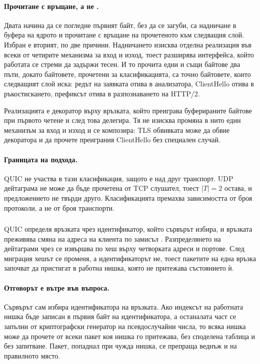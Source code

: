 \paragraph{Прочитане с връщане, а не .} Двата начина да се погледне първият
байт, без да се загуби, са надничане в буфера на ядрото и прочитане с връщане на прочетеното
към следващия слой. Избран е вторият, по две причини. Надничането изисква отделна реализация
във всеки от четирите механизма за вход и изход, тоест разширява интерфейса, който работата
се стреми да задържи тесен. И то прочита едни и същи байтове два пъти, докато байтовете,
прочетени за класификацията, са точно байтовете, които следващият слой иска: редът на заявката
отива в анализатора, ClientHello отива в ръкостискането, префиксът отива в разпознаването на
HTTP/2.

Реализацията е декоратор върху връзката, който преиграва буферираните байтове при първото
четене и след това делегира. Тя не изисква промяна в нито един механизъм за вход и изход и се
композира: TLS обвивката може да обвие декоратора и да прочете преиграния ClientHello без
специален случай.

\paragraph{Границата на подхода.} QUIC не участва в тази класификация, защото е над друг
транспорт. UDP дейтаграма не може да бъде прочетена от TCP слушател, тоест \(|T| = 2\)
остава, и предложението не твърди друго. Класификацията премахва зависимостта от броя
протоколи, а не от броя транспорти.

\subsubsection*{}

QUIC определя връзката чрез идентификатор, който сървърът избира, и връзката преживява смяна
на адреса на клиента по замисъл \cite{rfc9000}. Разпределянето на дейтаграми чрез
 се извършва по хеш върху четворката адреси и портове. След миграция
хешът се променя, а идентификаторът не, тоест пакетите на една връзка започват да пристигат в
работна нишка, която не притежава състоянието ѝ.

\paragraph{Отговорът е вътре във въпроса.} Сървърът сам избира идентификатора на връзката. Ако
индексът на работната нишка бъде записан в първия байт на идентификатора, а останалата част се
запълни от криптографски генератор на псевдослучайни числа, то всяка нишка може да прочете от
всеки пакет коя нишка го притежава, без споделена таблица и без запитване. Пакет, попаднал
при чужда нишка, се препраща веднъж и на правилното място.

